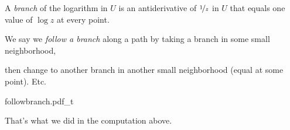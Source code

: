 \documentclass[10pt,aspectratio=169]{beamer}
\begin{document}
\begin{frame}
A \emph{branch} of the logarithm in $U$ is an antiderivative of
$\nicefrac{1}{z}$ in $U$ that equals one value of $\log z$ at every point.

\medskip
\pause

We say we \emph{follow a branch} along a path by taking a branch in some
small neighborhood,

\pause

then change to another branch in another small
neighborhood (equal at some point). \pause Etc.

\medskip
\pause

\begin{center}
{followbranch.pdf_t}
\end{center}

\medskip
\pause

That's what we did in the computation above.
\end{frame}
\end{document}
